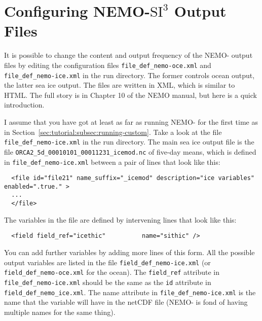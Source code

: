\section{Configuring \texorpdfstring{NEMO-$\mathrm{SI}^3$}{NEMO-SI3} Output Files}
\label{sec:outputs}

It is possible to change the content and output frequency of the NEMO-\SIcu{} output files by editing the configuration files \verb|file_def_nemo-oce.xml| and \verb|file_|\linebreak\verb|def_nemo-ice.xml| in the run directory.
The former controls ocean output, the latter sea ice output.
The files are written in XML, which is similar to HTML.
The full story is in Chapter 10 of the NEMO manual, but here is a quick introduction.

I assume that you have got at least as far as running NEMO-\SIcu{} for the first time as in Section~\ref{sec:tutorial:subsec:running-custom}.
Take a look at the file \verb|file_def_nemo-ice.|\linebreak\verb|xml| in the run directory.
The main sea ice output file is the file \verb|ORCA2_5d_|\linebreak\verb|00010101_00011231_icemod.nc| of five-day means, which is defined in \verb|file_|\linebreak\verb|def_nemo-ice.xml| between a pair of lines that look like this:

\begin{verbatim}
  <file id="file21" name_suffix="_icemod" description="ice variables" enabled=".true." >
  ...
  </file>
\end{verbatim}

\noindent{}The variables in the file are defined by intervening lines that look like this:

\begin{verbatim}
  <field field_ref="icethic"          name="sithic" />
\end{verbatim}

\noindent{}You can add further variables by adding more lines of this form.
All the possible output variables are listed in the file \verb|field_def_nemo-ice.xml| (or \verb|field_def_nemo-oce.xml| for the ocean).
The \verb|field_ref| attribute in \verb|file_|\linebreak\verb|def_nemo-ice.xml| should be the same as the \verb|id| attribute in \verb|field_def_nemo_|\linebreak\verb|ice.xml|.
The name attribute in \verb|file_def_nemo-ice.xml| is the name that the variable will have in the netCDF file (NEMO-\SIcu{} is fond of having multiple names for the same thing).

